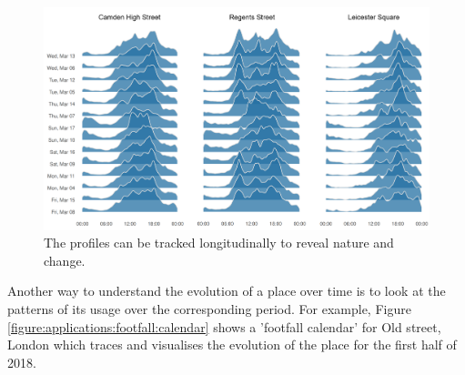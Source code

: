 \begin{figure}
  \includegraphics[trim={0 10 0 0},clip]{images/applications-location-profiles.png}
  \caption{The profiles can be tracked longitudinally to reveal nature and change.}
  \label{figure:applications:location:profiles}
\end{figure}

Another way to understand the evolution of a place over time is to look at the patterns of its usage over the corresponding period.
For example, Figure \ref{figure:applications:footfall:calendar} shows a 'footfall calendar' for Old street, London which traces and visualises the evolution of the place for the first half of 2018.


